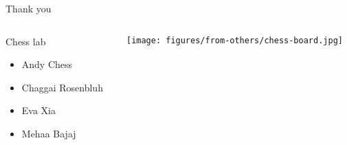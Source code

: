 \documentclass{beamer}
\begin{document}
\begin{frame}[label=chess-lab]{Thank you}
\begin{columns}[t]
\begin{column}{0.6\textwidth}

Chess lab
\begin{itemize}
\item Andy Chess
\item Chaggai Rosenbluh
\item Eva Xia
\item Mehaa Bajaj   
\end{itemize}
\end{column}

\begin{column}{0.4\textwidth}

\texttt{[image: figures/from-others/chess-board.jpg]}
\end{column}
\end{columns}
\end{frame}
\end{document}
